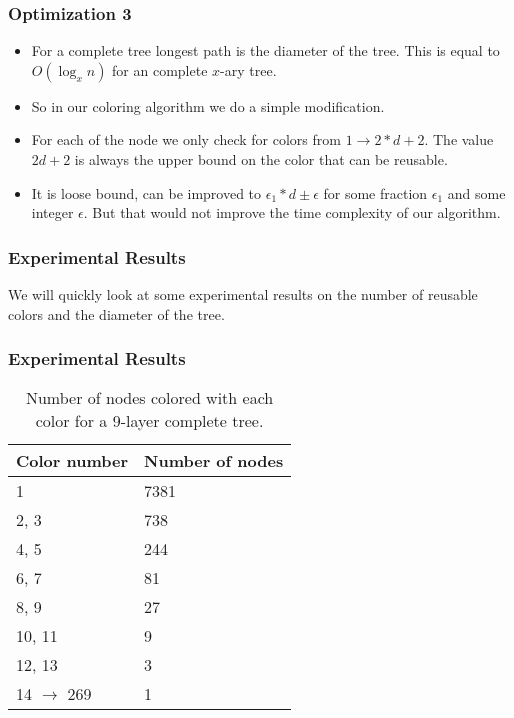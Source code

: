 \begin{frame}
    \frametitle{Optimization 3}


    \begin{itemize}
        \item For a complete tree longest path is the diameter of the tree. This is equal to $O(\log_{x} n)$ for an complete $x$-ary tree.\pause[]
        \item So in our coloring algorithm we do a simple modification.\pause[]
        \item For each of the node we only check for colors from $1 \to 2*d+2$. The value $2d+2$ is always the upper bound on the color that can be reusable.\pause[]
        \item It is loose bound, can be improved to $\epsilon_1*d \pm \epsilon$ for some fraction $\epsilon_1$ and some integer $\epsilon$. But that would not improve the time complexity of our algorithm.
    \end{itemize}
\end{frame}

\begin{frame}
    \frametitle{Experimental Results}

    We will quickly look at some experimental results on the number of reusable colors and the diameter of the tree.

\end{frame}


\begin{frame}
    \frametitle{Experimental Results}

    \begin{table}[h]
        \centering
        \begin{tabular}{|l|l|}
            \hline
            \textbf{Color number} & \textbf{Number of nodes} \\ \hline
            1                      & 7381                      \\ \hline
            2, 3                      & 738                       \\ \hline
            4, 5                      & 244                       \\ \hline
            6, 7                      & 81                        \\ \hline
            8, 9                      & 27                        \\ \hline
            10, 11                     & 9                         \\ \hline
            12, 13                     & 3                         \\ \hline
            14 $\to$ 269  & 1\\ \hline
        \end{tabular}
        \caption{Number of nodes colored with each color for a 9-layer complete tree.}
        \label{tab:colors}
    \end{table}

\end{frame}
